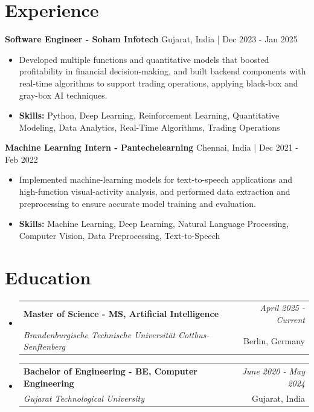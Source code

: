 \documentclass[a4paper,11pt]{article}
\makeatletter
\newcommand{\resumeSubheading}[4]{
\vspace{0.5mm}\item
    \begin{tabular*}{0.98\textwidth}[t]{l@{\extracolsep{\fill}}r}
        \textbf{#1} & \textit{\footnotesize{#4}} \\
        \textit{\footnotesize{#3}} &  \footnotesize{#2}\\
    \end{tabular*}
    \vspace{-2.4mm}
}
\makeatother
\begin{document}
\section{\textbf{Experience}}


\vspace{1mm}
  \textbf{Software Engineer - Soham Infotech} \hfill Gujarat, India | Dec 2023 - Jan 2025
\vspace{-1.5mm} %
\begin{itemize}
  \item Developed multiple functions and quantitative models that boosted profitability in financial decision-making, and built backend components with real-time algorithms to support trading operations, applying black-box and gray-box AI techniques.

\vspace{-2mm}
  \item \textbf{Skills:} Python, Deep Learning, Reinforcement Learning, Quantitative Modeling, Data Analytics, Real-Time Algorithms, Trading Operations
\end{itemize}

\vspace{1mm}
  \textbf{Machine Learning Intern - Pantechelearning} \hfill Chennai, India | Dec 2021 - Feb 2022
\vspace{-1.5mm} %
\begin{itemize}
  \item Implemented machine-learning models for text-to-speech applications and high-function visual-activity analysis, and performed data extraction and preprocessing to ensure accurate model training and evaluation.
\vspace{-2mm}
  \item \textbf{Skills:} Machine Learning, Deep Learning, Natural Language Processing, Computer Vision, Data Preprocessing, Text-to-Speech
\end{itemize}\section{\textbf{Education}}
\vspace{-0.4mm}

\begin{itemize}
\resumeSubheading
{Master of Science - MS, Artificial Intelligence }{Berlin, Germany}
{Brandenburgische Technische Universität Cottbus-Senftenberg  }{April 2025 - Current}

\vspace{1.0mm} %
\resumeSubheading
{Bachelor of Engineering - BE, Computer Engineering  }{Gujarat, India}
{Gujarat Technological University }{June 2020 - May 2024}

\end{itemize}
\end{document}
